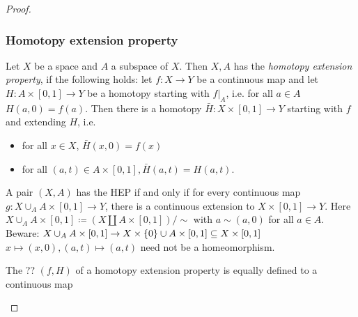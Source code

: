 \documentclass{TemplateLecture}
\begin{document}
\begin{proof}
    \subsubsection*{Homotopy extension property}
    \begin{defi}{}{}
        Let \(X\) be a space and \(A\) a subspace of \(X\). Then \(X,A\) has the \emph{homotopy extension property}, if the following holds: let \(f\colon X\to Y\) be a continuous map and let \(H\colon A\times [0,1] \to Y\) be a homotopy starting with \(f\rvert_A\), i.e. for all \(a \in A\) \(H(a,0) = f(a)\). Then there is a homotopy \(\bar H \colon X \times [0,1] \to Y\) starting with \(f\)and extending \(H\), i.e.
        \begin{itemize}
            \item for all \(x \in X\), \(\bar H(x,0) = f(x)\)
            \item for all \((a,t) \in A\times [0,1], \bar H(a,t) = H(a,t)\).
        \end{itemize}
    \end{defi}
    \begin{lem}
        A pair \((X,A)\) has the HEP if and only if for every continuous map \(g\colon X\cup_A A \times [0,1] \to Y\), there is a continuous extension to \(X\times [0,1] \to Y\). Here \(X \cup_A A \times [0,1] \coloneq (X\amalg A \times [0,1])/\sim\) with \(a \sim (a,0)\) for all \(a \in A\).
        Beware: \(X\cup_A A\times [0,1] \to X \times \{0\} \cup A \times [0,1] \subseteq X \times [0,1]\) \(x \mapsto (x,0), (a,t) \mapsto (a,t)\)
        need not be a homeomorphism.
    \end{lem}
    \begin{proposition}
        The  ?? \((f, H)\) of a homotopy extension property is equally defined to a continuous map
        \[\]%


\end{proposition}
\end{proof}
\end{document}
